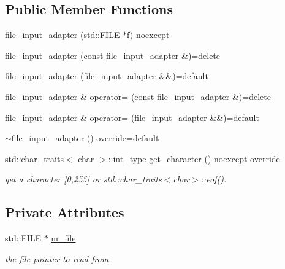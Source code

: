 \subsection*{Public Member Functions}
\begin{DoxyCompactItemize}
\item 
\mbox{\hyperlink{classnlohmann_1_1detail_1_1file__input__adapter_aeade050f2793280503be93feff2ece5b}{file\+\_\+input\+\_\+adapter}} (std\+::\+F\+I\+LE $\ast$f) noexcept
\item 
\mbox{\hyperlink{classnlohmann_1_1detail_1_1file__input__adapter_a308099b496a0cba2123a06fe99a95d02}{file\+\_\+input\+\_\+adapter}} (const \mbox{\hyperlink{classnlohmann_1_1detail_1_1file__input__adapter}{file\+\_\+input\+\_\+adapter}} \&)=delete
\item 
\mbox{\hyperlink{classnlohmann_1_1detail_1_1file__input__adapter_a10b4dec4e8751a4f8a110fa917f0d5a8}{file\+\_\+input\+\_\+adapter}} (\mbox{\hyperlink{classnlohmann_1_1detail_1_1file__input__adapter}{file\+\_\+input\+\_\+adapter}} \&\&)=default
\item 
\mbox{\hyperlink{classnlohmann_1_1detail_1_1file__input__adapter}{file\+\_\+input\+\_\+adapter}} \& \mbox{\hyperlink{classnlohmann_1_1detail_1_1file__input__adapter_ad59bbc7e3f23dd74475c5cb818784e42}{operator=}} (const \mbox{\hyperlink{classnlohmann_1_1detail_1_1file__input__adapter}{file\+\_\+input\+\_\+adapter}} \&)=delete
\item 
\mbox{\hyperlink{classnlohmann_1_1detail_1_1file__input__adapter}{file\+\_\+input\+\_\+adapter}} \& \mbox{\hyperlink{classnlohmann_1_1detail_1_1file__input__adapter_a95adaec9a8c583a46083c4c493981e77}{operator=}} (\mbox{\hyperlink{classnlohmann_1_1detail_1_1file__input__adapter}{file\+\_\+input\+\_\+adapter}} \&\&)=default
\item 
\mbox{\hyperlink{classnlohmann_1_1detail_1_1file__input__adapter_af96552e4560be08b201e62a36e6b6189}{$\sim$file\+\_\+input\+\_\+adapter}} () override=default
\item 
std\+::char\+\_\+traits$<$ char $>$\+::int\+\_\+type \mbox{\hyperlink{classnlohmann_1_1detail_1_1file__input__adapter_a0d4ff48617c8f63c30babdfd09482329}{get\+\_\+character}} () noexcept override
\begin{DoxyCompactList}\small\item\em get a character \mbox{[}0,255\mbox{]} or std\+::char\+\_\+traits$<$char$>$\+::eof(). \end{DoxyCompactList}\end{DoxyCompactItemize}
\subsection*{Private Attributes}
\begin{DoxyCompactItemize}
\item 
std\+::\+F\+I\+LE $\ast$ \mbox{\hyperlink{classnlohmann_1_1detail_1_1file__input__adapter_a164fbe2739ac97e517e22bc1fff1c174}{m\+\_\+file}}
\begin{DoxyCompactList}\small\item\em the file pointer to read from \end{DoxyCompactList}\end{DoxyCompactItemize}


